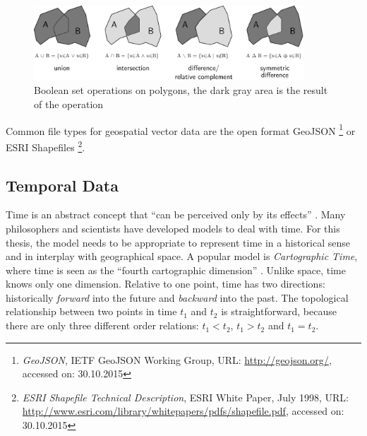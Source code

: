 \begin{figure}[ht]
  \centering
  \includegraphics[width=0.9\textwidth]{graphics/basics/hgis/polygon_operations}
  \caption{Boolean set operations on polygons, the dark gray area is the result of the operation}
  \label{fig:polygon_operations}
\end{figure}

Common file types for geospatial vector data are the open format GeoJSON
\footnote{
  \emph{GeoJSON},
  IETF GeoJSON Working Group,
  URL: \url{http://geojson.org/},
  accessed on: 30.10.2015
}
or ESRI Shapefiles
\footnote{
  \emph{ESRI Shapefile Technical Description},
  ESRI White Paper, July 1998,
  URL: \url{http://www.esri.com/library/whitepapers/pdfs/shapefile.pdf},
  accessed on: 30.10.2015
}.



\subsection{Temporal Data} %
\label{sub:temporal_data}

Time is an abstract concept that ``can be perceived only by its effects''
\cite[p. 27]{Langran1989timeingis}.
Many philosophers and scientists have developed models to deal with time. For this thesis, the model needs to be appropriate to represent time in a historical sense and in interplay with geographical space. A popular model is \emph{Cartographic Time}, where time is seen as the ``fourth cartographic dimension''
\cite[p. 28]{Langran1989timeingis}.
Unlike space, time knows only one dimension. Relative to one point, time has two directions: historically \emph{forward} into the future and \emph{backward} into the past.
The topological relationship between two points in time $t_1$ and $t_2$ is straightforward, because there are only three different order relations: $t_1 < t_2$, $t_1 > t_2$ and $t_1 = t_2$.

